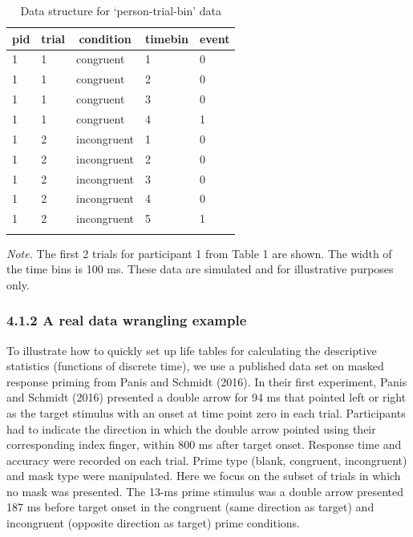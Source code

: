 \documentclass[
  man, donotrepeattitle,floatsintext]{apa6}
\begin{document}
\begin{table}[H]

\begin{center}
\begin{threeparttable}

\caption{\label{tab:ha-data-table}Data structure for `person-trial-bin' data}

\begin{tabular}{lllll}
\toprule
pid & \multicolumn{1}{c}{trial} & \multicolumn{1}{c}{condition} & \multicolumn{1}{c}{timebin} & \multicolumn{1}{c}{event}\\
\midrule
1 & 1 & congruent & 1 & 0\\
1 & 1 & congruent & 2 & 0\\
1 & 1 & congruent & 3 & 0\\
1 & 1 & congruent & 4 & 1\\
1 & 2 & incongruent & 1 & 0\\
1 & 2 & incongruent & 2 & 0\\
1 & 2 & incongruent & 3 & 0\\
1 & 2 & incongruent & 4 & 0\\
1 & 2 & incongruent & 5 & 1\\
\bottomrule
\addlinespace
\end{tabular}

\begin{tablenotes}[para]
\normalsize{\textit{Note.} The first 2 trials for participant 1 from Table 1 are shown. The width of the time bins is 100 ms. These data are simulated and for illustrative purposes only.}
\end{tablenotes}

\end{threeparttable}
\end{center}

\end{table}

\subsubsection{4.1.2 A real data wrangling example}\label{a-real-data-wrangling-example}

To illustrate how to quickly set up life tables for calculating the descriptive statistics (functions of discrete time), we use a published data set on masked response priming from Panis and Schmidt (2016).
In their first experiment, Panis and Schmidt (2016) presented a double arrow for 94 ms that pointed left or right as the target stimulus with an onset at time point zero in each trial. Participants had to indicate the direction in which the double arrow pointed using their corresponding index finger, within 800 ms after target onset. Response time and accuracy were recorded on each trial. Prime type (blank, congruent, incongruent) and mask type were manipulated. Here we focus on the subset of trials in which no mask was presented. The 13-ms prime stimulus was a double arrow presented 187 ms before target onset in the congruent (same direction as target) and incongruent (opposite direction as target) prime conditions.
\end{document}
